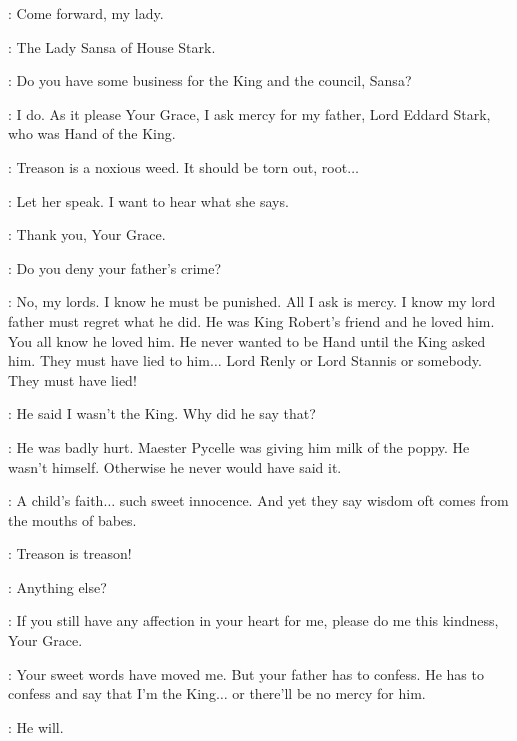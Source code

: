 \JOFFREY: Come forward, my lady. 


\HERALD: The Lady Sansa of House Stark. 

\CERSEI: Do you have some business for the King and the council, Sansa? 

\SANSA: I do.  As it please Your Grace, I ask mercy for my father, Lord Eddard Stark, who was Hand of the King. 

\PYCELLE: Treason is a noxious weed. It should be torn out, root$\ldots$  

\JOFFREY: Let her speak. I want to hear what she says. 

\SANSA: Thank you, Your Grace. 

\LITTLEFINGER: Do you deny your father's crime? 

\SANSA: No, my lords. I know he must be punished. All I ask is mercy. I know my lord father must regret what he did. He was King Robert's friend and he loved him. You all know he loved him. He never wanted to be Hand until the King asked him. They must have lied to him$\ldots$ Lord Renly or Lord Stannis or somebody. They must have lied! 

\JOFFREY: He said I wasn't the King. Why did he say that? 

\SANSA: He was badly hurt. Maester Pycelle was giving him milk of the poppy. He wasn't himself. Otherwise he never would have said it. 

\VARYS: A child's faith$\ldots$ such sweet innocence. And yet they say wisdom oft comes from the mouths of babes. 

\PYCELLE: Treason is treason! 

\JOFFREY: Anything else? 

\SANSA: If you still have any affection in your heart for me, please do me this kindness, Your Grace. 

\JOFFREY: Your sweet words have moved me. But your father has to confess. He has to confess and say that I'm the King$\ldots$ or there'll be no mercy for him. 

\SANSA: He will. 


